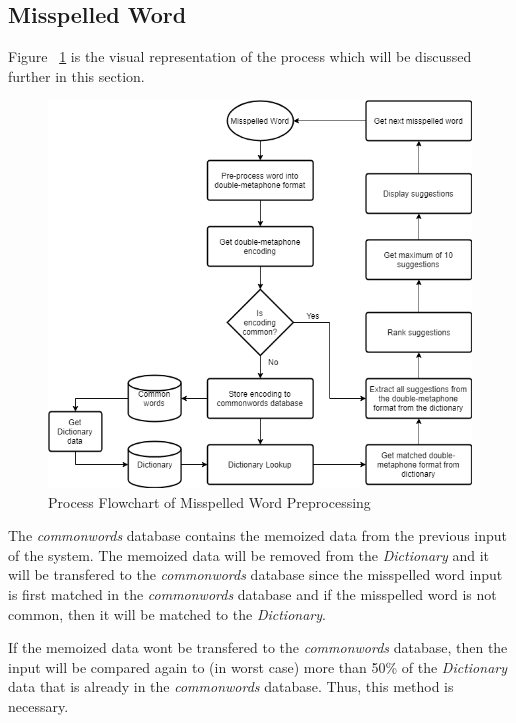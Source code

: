 \documentclass[12pt]{book}
\begin{document}
\subsection{Misspelled Word}
Figure ~\ref{processflowchart} is the visual representation of the process which will be discussed further in this section.

\begin{figure}
\begin{center}	
\includegraphics[scale=.60]{processflowchart.png}
	\caption[Process Flowchart of Misspelled  Word Preprocessing]
	{Process Flowchart of Misspelled  Word Preprocessing}	
	\label{processflowchart}
\end{center}
\end{figure}

The \textit{commonwords} database contains the memoized data from the previous input of the system. The memoized data will be removed from the \textit{Dictionary} and it will be transfered to the \textit{commonwords} database since the misspelled word input is first matched in the \textit{commonwords} database and if the misspelled word is not common, then it will be matched to the \textit{Dictionary}.

If the memoized data wont be transfered to the \textit{commonwords} database, then the input will be compared again to (in worst case) more than 50\% of the \textit{Dictionary} data that is already in the \textit{commonwords} database. Thus, this method is necessary.
\end{document}
